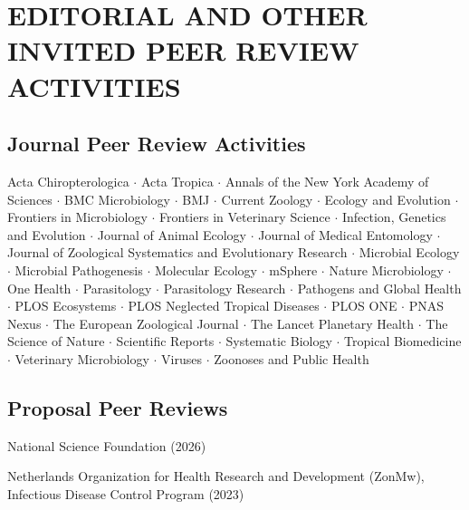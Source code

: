 \documentclass{cv}
\begin{document}


\section*{EDITORIAL AND OTHER INVITED PEER REVIEW ACTIVITIES}

\subsection*{Journal Peer Review Activities}

Acta Chiropterologica $\cdot$ Acta Tropica $\cdot$ Annals of the New York Academy of Sciences $\cdot$ BMC Microbiology $\cdot$ BMJ $\cdot$ Current Zoology $\cdot$ Ecology and Evolution $\cdot$ Frontiers in Microbiology $\cdot$ Frontiers in Veterinary Science $\cdot$ Infection, Genetics and Evolution $\cdot$ Journal of Animal Ecology $\cdot$ Journal of Medical Entomology $\cdot$ Journal of Zoological Systematics and Evolutionary Research $\cdot$ Microbial Ecology $\cdot$ Microbial Pathogenesis $\cdot$ Molecular Ecology $\cdot$ mSphere $\cdot$ Nature Microbiology $\cdot$ One Health $\cdot$ Parasitology $\cdot$ Parasitology Research $\cdot$ Pathogens and Global Health $\cdot$ PLOS Ecosystems $\cdot$ PLOS Neglected Tropical Diseases $\cdot$ PLOS ONE $\cdot$ PNAS Nexus $\cdot$ The European Zoological Journal $\cdot$ The Lancet Planetary Health $\cdot$ The Science of Nature $\cdot$ Scientific Reports $\cdot$ Systematic Biology $\cdot$ Tropical Biomedicine $\cdot$ Veterinary Microbiology $\cdot$ Viruses $\cdot$ Zoonoses and Public Health

\subsection*{Proposal Peer Reviews}

National Science Foundation (2026)

Netherlands Organization for Health Research and Development (ZonMw), Infectious Disease Control Program (2023)

\end{document}

